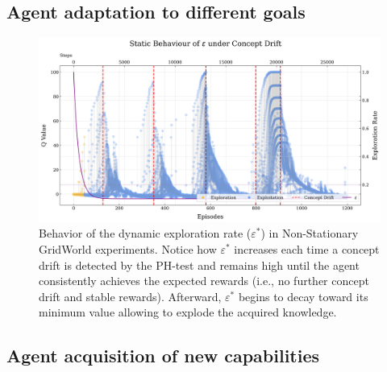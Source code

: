 \subsection{Agent adaptation to different goals}


\begin{figure}
    \centering
    \includegraphics[width=\textwidth]{figures/trad_eps.png}
    \caption{Behavior of the dynamic exploration rate ($\varepsilon^*$) in Non-Stationary GridWorld experiments. Notice how $\varepsilon^*$ increases each time a concept drift is detected by the PH-test and remains high until the agent consistently achieves the expected rewards (i.e., no further concept drift and stable rewards). Afterward, $\varepsilon^*$ begins to decay toward its minimum value allowing to explode the acquired knowledge.}
    \label{fig:epsilon}
\end{figure}

\subsection{Agent acquisition of new capabilities}


\endinput

